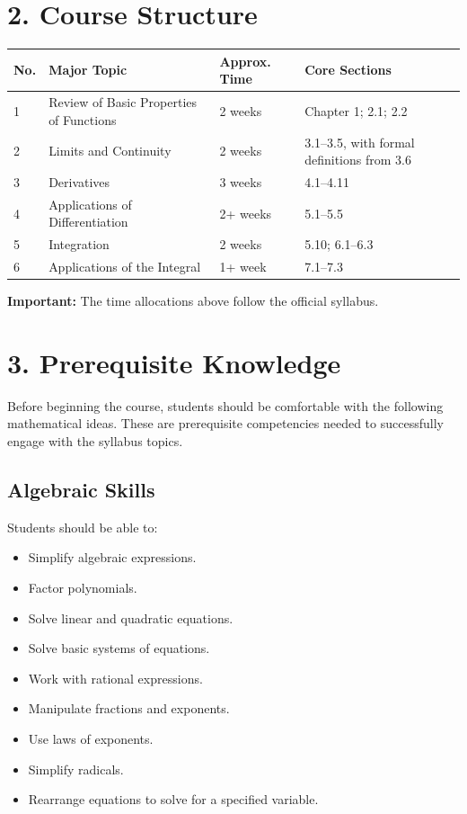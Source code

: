 \documentclass[11pt]{article}
\newcommand{\important}[1]{\textbf{Important:} #1}
\begin{document}
\section{2. Course Structure}

\begin{longtable}{p{} p{} p{} p{}}
\toprule
\textbf{No.} & \textbf{Major Topic} & \textbf{Approx. Time} &
\textbf{Core Sections} \\
\midrule
1 & Review of Basic Properties of Functions & 2 weeks &
Chapter 1; 2.1; 2.2 \\
2 & Limits and Continuity & 2 weeks &
3.1--3.5, with formal definitions from 3.6 \\
3 & Derivatives & 3 weeks &
4.1--4.11 \\
4 & Applications of Differentiation & 2+ weeks &
5.1--5.5 \\
5 & Integration & 2 weeks &
5.10; 6.1--6.3 \\
6 & Applications of the Integral & 1+ week &
7.1--7.3 \\
\bottomrule
\end{longtable}

\important{The time allocations above follow the official syllabus.}

\section{3. Prerequisite Knowledge}

Before beginning the course, students should be comfortable with the following
mathematical ideas. These are prerequisite competencies needed to successfully
engage with the syllabus topics.

\subsection{Algebraic Skills}

Students should be able to:

\begin{itemize}
    \item Simplify algebraic expressions.
    \item Factor polynomials.
    \item Solve linear and quadratic equations.
    \item Solve basic systems of equations.
    \item Work with rational expressions.
    \item Manipulate fractions and exponents.
    \item Use laws of exponents.
    \item Simplify radicals.
    \item Rearrange equations to solve for a specified variable.
\end{itemize}
\end{document}
